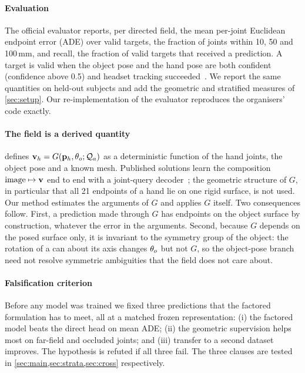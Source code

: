 \paragraph{Evaluation}
The official evaluator reports, per directed field, the mean per-joint Euclidean endpoint error (ADE) over valid targets, the fraction of joints within 10, 50 and 100\,mm, and recall, the fraction of valid targets that received a prediction. A target is valid when the object pose and the hand pose are both confident (confidence above 0.5) and headset tracking succeeded~\cite{rim2026show3dapi}. We report the same quantities on held-out subjects and add the geometric and stratified measures of \cref{sec:setup}. Our re-implementation of the evaluator reproduces the organisers' code exactly.

\paragraph{The field is a derived quantity}
 defines $\mathbf{v}_h=G(\mathbf{p}_h,\theta_o;\mathcal{Q}_a)$ as a deterministic function of the hand joints, the object pose and a known mesh. Published solutions learn the composition $\mathrm{image}\mapsto\mathbf{v}$ end to end with a joint-query decoder~\cite{zou2026golf,jin2026jssr}; the geometric structure of $G$, in particular that all 21 endpoints of a hand lie on one rigid surface, is not used. Our method estimates the arguments of $G$ and applies $G$ itself. Two consequences follow. First, a prediction made through $G$ has endpoints on the object surface by construction, whatever the error in the arguments. Second, because $G$ depends on the posed surface only, it is invariant to the symmetry group of the object: the rotation of a can about its axis changes $\theta_o$ but not $G$, so the object-pose branch need not resolve symmetric ambiguities that the field does not care about.

\paragraph{Falsification criterion}
Before any model was trained we fixed three predictions that the factored formulation has to meet, all at a matched frozen representation: (i) the factored model beats the direct head on mean ADE; (ii) the geometric supervision helps most on far-field and occluded joints; and (iii) transfer to a second dataset improves. The hypothesis is refuted if all three fail. The three clauses are tested in \cref{sec:main,sec:strata,sec:cross} respectively.
